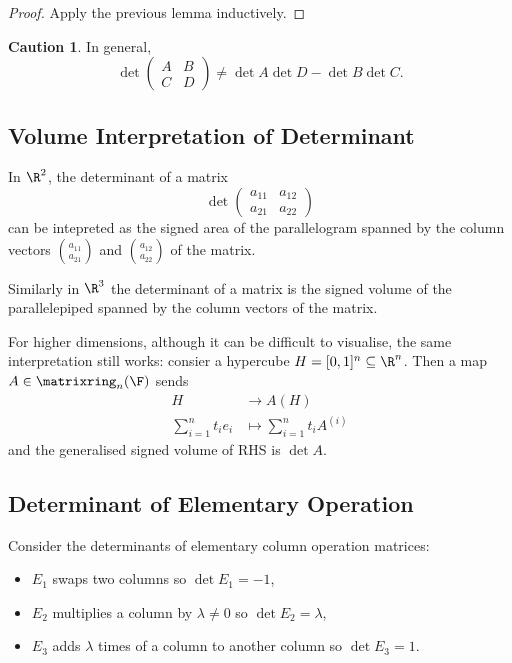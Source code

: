 \documentclass[a4paper]{article}
\newcommand*{\M}{\matrixring}
\theoremstyle{definition}
\newtheorem*{caution}{Caution}
\begin{document}
\begin{proof}
  Apply the previous lemma inductively.
\end{proof}

\begin{caution}
  In general,
  \[
    \det
    \begin{pmatrix}
      A & B \\
      C & D
    \end{pmatrix}
    \neq \det A \det D - \det B \det C.
  \]
\end{caution}

\subsection{Volume Interpretation of Determinant}

In \(\R^2\), the determinant of a matrix
\[
  \det
  \begin{pmatrix}
    a_{11} & a_{12} \\
    a_{21} & a_{22} 
  \end{pmatrix}
\]
can be intepreted as the signed area of the parallelogram spanned by the column vectors \(\binom{a_{11}}{a_{21}}\) and \(\binom{a_{12}}{a_{22}}\) of the matrix.
    
Similarly in \(\R^3\) the determinant of a matrix is the signed volume of the parallelepiped spanned by the column vectors of the matrix.

For higher dimensions, although it can be difficult to visualise, the same interpretation still works: consier a hypercube \(H = [0, 1]^n \subseteq \R^n\). Then a map \(A \in \M_n(\F)\) sends
\begin{align*}
  H &\to A(H) \\
  \sum_{i = 1}^{n} t_ie_i &\mapsto \sum_{i = 1}^{n}t_i A^{(i)}
\end{align*}
and the generalised signed volume of RHS is \(\det A\).

\subsection{Determinant of Elementary Operation}

Consider the determinants of elementary column operation matrices:
\begin{itemize}
\item \(E_1\) swaps two columns so \(\det E_1 = -1\),
\item \(E_2\) multiplies a column by \(\lambda \neq 0\) so \(\det E_2 = \lambda\),
\item \(E_3\) adds \(\lambda\) times of a column to another column so \(\det E_3 = 1\).
\end{itemize}
\end{document}
